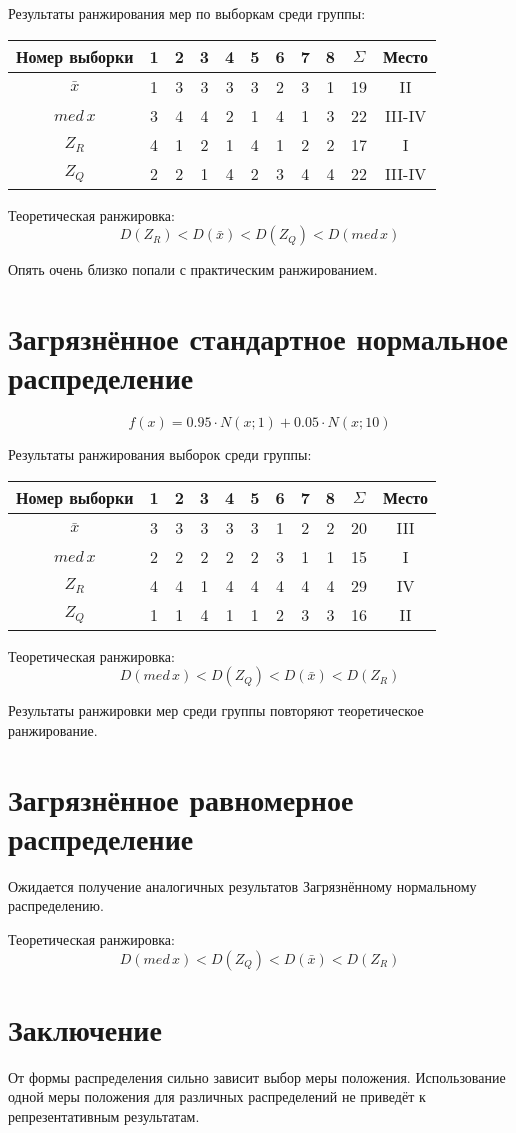 \documentclass{article} %
\begin{document}
Результаты ранжирования мер по выборкам среди группы:
\begin{center}
	\begin{tabular}{|c| c|c|c|c|c|c|c|c| c|c|} \hline
		Номер выборки & 1 & 2 & 3 & 4 & 5 & 6 & 7 & 8 & \(\Sigma\) & Место \\ \hline
		\(\bar{x}\)   & 1 & 3 & 3 & 3 & 3 & 2 & 3 & 1 & 19 & II \\ \hline
		\(med \, x\)  & 3 & 4 & 4 & 2 & 1 & 4 & 1 & 3 & 22 & III-IV \\ \hline
		\(Z_R\)       & 4 & 1 & 2 & 1 & 4 & 1 & 2 & 2 & 17 & I \\ \hline
		\(Z_Q\)       & 2 & 2 & 1 & 4 & 2 & 3 & 4 & 4 & 22 & III-IV \\ \hline
	\end{tabular}
\end{center}

Теоретическая ранжировка:
\[ D(Z_R) < D(\bar{x}) < D(Z_Q) < D(med \, x) \]

Опять очень близко попали с практическим ранжированием.

\section{Загрязнённое стандартное нормальное распределение}
\[ f(x) = 0.95 \cdot N(x;1) + 0.05 \cdot N(x;10)\]

Результаты ранжирования выборок среди группы:
\begin{center}
	\begin{tabular}{|c| c|c|c|c|c|c|c|c| c|c|} \hline
		Номер выборки & 1 & 2 & 3 & 4 & 5 & 6 & 7 & 8 & \(\Sigma\) & Место \\ \hline
		\(\bar{x}\)   & 3 & 3 & 3 & 3 & 3 & 1 & 2 & 2 & 20 & III \\ \hline
		\(med \, x\)  & 2 & 2 & 2 & 2 & 2 & 3 & 1 & 1 & 15 & I \\ \hline
		\(Z_R\)       & 4 & 4 & 1 & 4 & 4 & 4 & 4 & 4 & 29 & IV \\ \hline
		\(Z_Q\)       & 1 & 1 & 4 & 1 & 1 & 2 & 3 & 3 & 16 & II \\ \hline
	\end{tabular}
\end{center}

Теоретическая ранжировка:
\[ D(med \, x) < D(Z_Q) < D(\bar{x}) < D(Z_R) \]

Результаты ранжировки мер среди группы повторяют теоретическое ранжирование.

\section{Загрязнённое равномерное распределение}
Ожидается получение аналогичных результатов Загрязнённому нормальному распределению.

Теоретическая ранжировка:
\[ D(med \, x) < D(Z_Q) < D(\bar{x}) < D(Z_R) \]

\section{Заключение}
От формы распределения сильно зависит выбор меры положения. Использование одной меры положения для различных распределений не приведёт к репрезентативным результатам.
\end{document}
